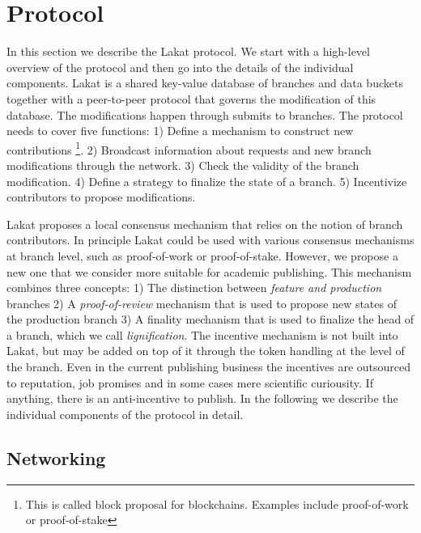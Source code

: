 
\section{Protocol}

In this section we describe the Lakat protocol. We start with a high-level overview of the protocol and then go into the details of the individual components. Lakat is a shared key-value database of branches and data buckets together with a peer-to-peer protocol that governs the modification of this database. The modifications happen through submits to branches. The protocol needs to cover five functions: 1) Define a mechanism to construct new contributions \footnote{This is called block proposal for blockchains. Examples include proof-of-work or proof-of-stake}. 2) Broadcast information about requests and new branch modifications through the network. 3) Check the validity of the branch modification. 4) Define a strategy to finalize the state of a branch. 5) Incentivize contributors to propose modifications. 

Lakat proposes a local consensus mechanism that relies on the notion of branch contributors. In principle Lakat could be used with various consensus mechanisms at branch level, such as proof-of-work or proof-of-stake. However, we propose a new one that we consider more suitable for academic publishing. This mechanism combines three concepts: 1) The distinction between \textit{feature and production} branches 2) A \textit{proof-of-review} mechanism that is used to propose new states of the production branch 3) A finality mechanism that is used to finalize the head of a branch, which we call \textit{lignification}. The incentive mechanism is not built into Lakat, but may be added on top of it through the token handling at the level of the branch. Even in the current publishing business the incentives are outsourced to reputation, job promises and in some cases mere scientific curiousity. If anything, there is an anti-incentive to publish. In the following we describe the individual components of the protocol in detail.

\subsection{Networking}
\label{ssc:networking}

